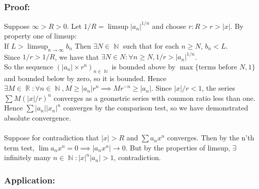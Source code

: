 \documentclass{article}
\DeclareMathOperator\R{\mathbb{R}}
\DeclareMathOperator\N{\mathbb{N}}
\begin{document}
\subsubsection*{Proof:}
Suppose $\infty > R > 0$.
Let $1 \slash R = \limsup |a_n|^{1 \slash n}$ and choose $r:R>r>|x|$.
By property one of limsup: \\
\newline
If $L > \limsup_{n \to \infty}b_n$
Then $\exists N \in \N$ such that for each $n \geq N$, $b_n < L$. \\
\newline
Since $1 \slash r > 1 \slash R$, we have that $\exists N \in N: \forall n \geq N, 1 \slash r > |a_n|^{1 \slash n}$. \\
\newline
So the sequence $(|a_n|\times r^n)_{n \in \N}$ is bounded above by $\max \{\text{terms before $N$},1 \}$
and bounded below by zero, so it is bounded.
Hence $\exists M \in \R:\forall n \in \N, M \geq |a_n|r^n \implies Mr^{-n} \geq |a_n|$.
Since $|x| \slash r < 1$, the series $\sum M (|x| \slash r)^n$ converges as a geometric series with common ratio
less than one. Hence $\sum |a_n||x_n|^n$ converges by the comparison test, so we have demonstrated absolute convergence. \\
\newline \\
Suppose for contradiction that $|x|>R$ and $\sum a_n x^n$ converges.
Then by the n'th term test, $\lim a_n x^n = 0 \implies |a_n x^n| \to 0$. But by the properties of limsup,
$\exists$ infinitely many $n \in \N: |x|^n|a_n|>1$, contradiction.
\subsubsection*{Application:}
\end{document}
